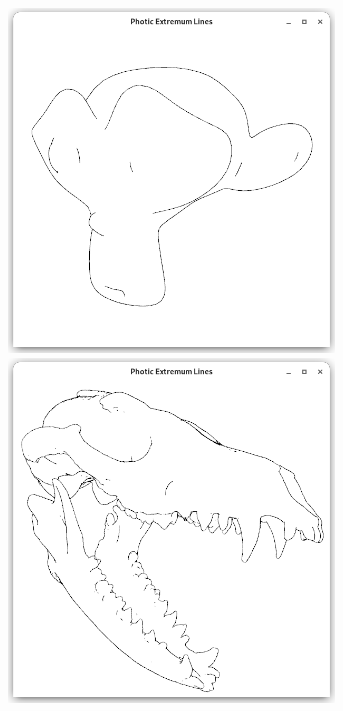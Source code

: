 \documentclass[9pt,fleqn,twoside,twocolumn]{stdglobal}
\begin{document}
\begin{figure}
\begin{subfigure}[t]{0.19\textwidth}
        \includegraphics[width=0.95\textwidth,trim={15px 15 15 50},clip]{images/results/suzanne-contours.png}
        \includegraphics[width=0.95\textwidth,trim={15px 15 15 50},clip]{images/results/skull-contours.png}

\end{subfigure}
\end{figure}
\end{document}
